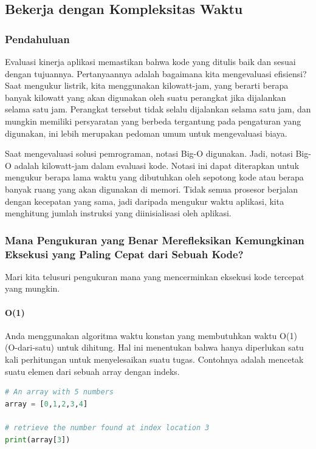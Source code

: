 \documentclass{article}
\begin{document}
\subsection{Bekerja dengan Kompleksitas Waktu}
\subsubsection{Pendahuluan}
Evaluasi kinerja aplikasi memastikan bahwa kode yang ditulis baik dan sesuai dengan tujuannya. Pertanyaannya adalah bagaimana kita mengevaluasi efisiensi? Saat mengukur listrik, kita menggunakan kilowatt-jam, yang berarti berapa banyak kilowatt yang akan digunakan oleh suatu perangkat jika dijalankan selama satu jam. Perangkat tersebut tidak selalu dijalankan selama satu jam, dan mungkin memiliki persyaratan yang berbeda tergantung pada pengaturan yang digunakan, ini lebih merupakan pedoman umum untuk mengevaluasi biaya.

Saat mengevaluasi solusi pemrograman, notasi Big-O digunakan. Jadi, notasi Big-O adalah kilowatt-jam dalam evaluasi kode. Notasi ini dapat diterapkan untuk mengukur berapa lama waktu yang dibutuhkan oleh sepotong kode atau berapa banyak ruang yang akan digunakan di memori. Tidak semua prosesor berjalan dengan kecepatan yang sama, jadi daripada mengukur waktu aplikasi, kita menghitung jumlah instruksi yang diinisialisasi oleh aplikasi.

\subsubsection{Mana Pengukuran yang Benar Merefleksikan Kemungkinan Eksekusi yang Paling Cepat dari Sebuah Kode?}
Mari kita telusuri pengukuran mana yang mencerminkan eksekusi kode tercepat yang mungkin.

\paragraph{O(1)}

Anda menggunakan algoritma waktu konstan yang membutuhkan waktu O(1) (O-dari-satu) untuk dihitung. Hal ini menentukan bahwa hanya diperlukan satu kali perhitungan untuk menyelesaikan suatu tugas. Contohnya adalah mencetak suatu elemen dari sebuah array dengan indeks.
\begin{lstlisting}[language=Python, caption={}, captionpos=b]
# An array with 5 numbers 
array = [0,1,2,3,4]

# retrieve the number found at index location 3 
print(array[3]) 
\end{lstlisting}
\end{document}
